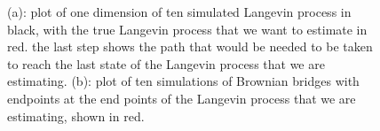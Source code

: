 \begin{figure}[H]%
    \centering
    \qquad
    \caption[Langevin and Brownian bridge paths]{(a): plot of one dimension of ten simulated Langevin process in black, with the true Langevin process that we want to estimate in red. the last step shows the path that would be needed to be taken to reach the last state of the Langevin process that we are estimating. (b): plot of ten simulations of Brownian bridges with endpoints at the end points of the Langevin process that we are estimating, shown in red.}%
    \label{fig:monte carlo paths}%
\end{figure}

\

